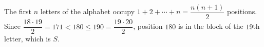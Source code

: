 The first \(n\) letters of the alphabet occupy \(1+2+\cdots+n=\dfrac{n(n+1)}{2}\) positions. Since \(\dfrac{18\cdot 19}{2}=171<180\le 190=\dfrac{19\cdot 20}{2}\), position \(180\) is in the block of the \(19\)th letter, which is \(\boxed{S}\).
